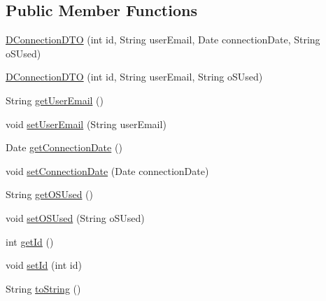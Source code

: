 \subsection*{Public Member Functions}
\begin{DoxyCompactItemize}
\item 
\mbox{\hyperlink{classes_1_1deusto_1_1bspq18_1_1e6_1_1_deusto_box_1_1_server_1_1dto_1_1_d_connection_d_t_o_aa7da4d26574b8087ce0ce505db3609b5}{D\+Connection\+D\+TO}} (int id, String user\+Email, Date connection\+Date, String o\+S\+Used)
\item 
\mbox{\hyperlink{classes_1_1deusto_1_1bspq18_1_1e6_1_1_deusto_box_1_1_server_1_1dto_1_1_d_connection_d_t_o_ac9cf5b0e481469c87616c70daefe11b8}{D\+Connection\+D\+TO}} (int id, String user\+Email, String o\+S\+Used)
\item 
String \mbox{\hyperlink{classes_1_1deusto_1_1bspq18_1_1e6_1_1_deusto_box_1_1_server_1_1dto_1_1_d_connection_d_t_o_af1d35da8c37d548d3d98e5113f3bcce2}{get\+User\+Email}} ()
\item 
void \mbox{\hyperlink{classes_1_1deusto_1_1bspq18_1_1e6_1_1_deusto_box_1_1_server_1_1dto_1_1_d_connection_d_t_o_a561a9e4877f9ab4ada0bf5f4f1faf4fd}{set\+User\+Email}} (String user\+Email)
\item 
Date \mbox{\hyperlink{classes_1_1deusto_1_1bspq18_1_1e6_1_1_deusto_box_1_1_server_1_1dto_1_1_d_connection_d_t_o_a303bfe185d327d61f51bbdec820f471b}{get\+Connection\+Date}} ()
\item 
void \mbox{\hyperlink{classes_1_1deusto_1_1bspq18_1_1e6_1_1_deusto_box_1_1_server_1_1dto_1_1_d_connection_d_t_o_ace59fbbc41eb60c2698d5bbdc933ffa4}{set\+Connection\+Date}} (Date connection\+Date)
\item 
String \mbox{\hyperlink{classes_1_1deusto_1_1bspq18_1_1e6_1_1_deusto_box_1_1_server_1_1dto_1_1_d_connection_d_t_o_a305ad4d868cf02d4a92645b52110c2d3}{get\+O\+S\+Used}} ()
\item 
void \mbox{\hyperlink{classes_1_1deusto_1_1bspq18_1_1e6_1_1_deusto_box_1_1_server_1_1dto_1_1_d_connection_d_t_o_aecef98af9e45b00ed2ab5c3c338a978c}{set\+O\+S\+Used}} (String o\+S\+Used)
\item 
int \mbox{\hyperlink{classes_1_1deusto_1_1bspq18_1_1e6_1_1_deusto_box_1_1_server_1_1dto_1_1_d_connection_d_t_o_ac4f30e30ba0c7b056be80037b2f920e9}{get\+Id}} ()
\item 
void \mbox{\hyperlink{classes_1_1deusto_1_1bspq18_1_1e6_1_1_deusto_box_1_1_server_1_1dto_1_1_d_connection_d_t_o_a7235ce79a5250fc52039b501aafa3017}{set\+Id}} (int id)
\item 
String \mbox{\hyperlink{classes_1_1deusto_1_1bspq18_1_1e6_1_1_deusto_box_1_1_server_1_1dto_1_1_d_connection_d_t_o_a5815999a995b62fac61041db01b19bf0}{to\+String}} ()
\end{DoxyCompactItemize}
